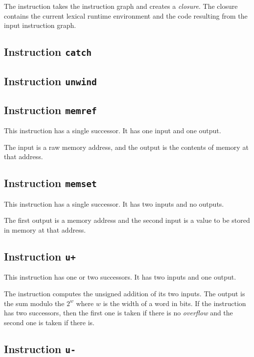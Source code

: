 The instruction takes the instruction graph and creates a
\emph{closure}.  The closure contains the current lexical runtime
environment and the code resulting from the input instruction graph.

\subsection{Instruction \texttt{catch}}
\label{mir-instruction-catch}

\subsection{Instruction \texttt{unwind}}
\label{mir-instruction-unwind}

\subsection{Instruction \texttt{memref}}
\label{mir-instruction-memref}

This instruction has a single successor.  It has one input and one
output.  

The input is a raw memory address, and the output is the contents of
memory at that address. 

\subsection{Instruction \texttt{memset}}
\label{mir-instruction-memset}

This instruction has a single successor.  It has two inputs and no
outputs. 

The first output is a memory address and the second input is a value
to be stored in memory at that address. 

\subsection{Instruction \texttt{u+}}
\label{mir-instruction-u+}

This instruction has one or two successors.  It has two inputs and one
output.

The instruction computes the unsigned addition of its two inputs.  The
output is the sum modulo the $2^w$ where $w$ is the width of a word in
bits.  If the instruction has two successors, then the first one is
taken if there is no \emph{overflow} and the second one is taken if
there is.  

\subsection{Instruction \texttt{u-}}
\label{mir-instruction-u-}

